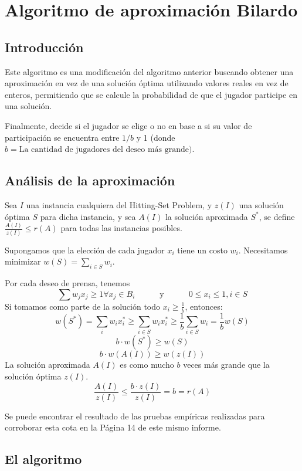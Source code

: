 \documentclass{estilo}
\begin{document}
\newpage

\section{Algoritmo de aproximación Bilardo}

\subsection{Introducción}

Este algoritmo es una modificación del algoritmo anterior buscando obtener una aproximación en vez de una solución óptima utilizando valores reales en vez de enteros, permitiendo que se calcule la probabilidad de que el jugador participe en una solución.

Finalmente, decide si el jugador se elige o no en base a si su valor de participación se encuentra entre $1/b$  y 1 (donde $b = \text{La cantidad de jugadores del deseo más grande)}$.

\subsection{Análisis de la aproximación}

Sea $I$ una instancia cualquiera del Hitting-Set Problem, y $z(I)$ una solución óptima $S$ para dicha instancia, y sea $A(I)$ la solución aproximada $S^*$, se define $\frac{A(I)}{z(I)} \leq r(A)$ para todas las instancias posibles.

Supongamos que la elección de cada jugador $x_i$ tiene un costo $w_i$. Necesitamos minimizar $w(S) = \sum_{i \in S} w_i$.

Por cada deseo de prensa, tenemos
\[\sum w_j x_j \ge 1 \forall x_j \in B_i \quad\quad\quad \text{y} \quad\quad\quad 0 \le x_i \le 1, i \in S\]
Si tomamos como parte de la solución todo $x_i \ge \frac{1}{b}$, entonces:
\[w(S^*) = \sum_{i} w_i x_i^* \ge \sum_{i \in S} w_i x_i^* \ge \frac{1}{b} \sum_{i \in S} w_i = \frac{1}{b} w(S)\]
\[b \cdot w(S^*) \ge w(S)\]
\[b \cdot w(A(I)) \ge w(z(I))\]
La solución aproximada $A(I)$ es como mucho $b$ veces más grande que la solución óptima $z(I)$.
\[\frac{A(I)}{z(I)}\le \frac{b \cdot z(I)}{z(I)} = b = r(A)\]
    
Se puede encontrar el resultado de las pruebas empíricas realizadas para corroborar esta cota en la Página 14 de este mismo informe.
\subsection{El algoritmo}
\end{document}

